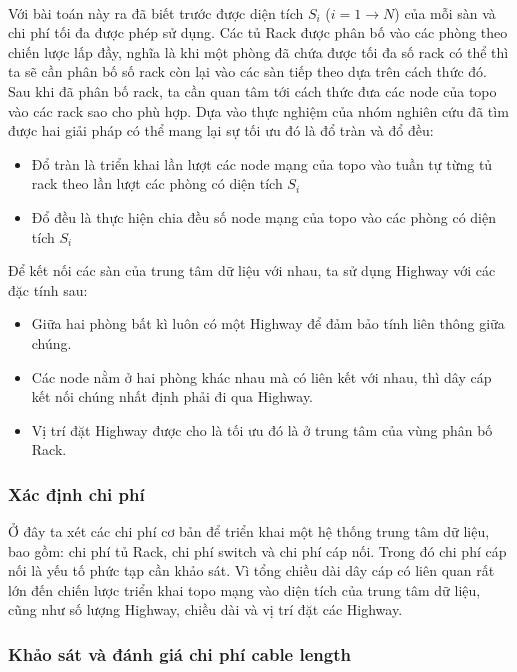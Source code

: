 \documentclass[../report.tex]{subfiles}
\begin{document}
\paragraph*{}
Với bài toán này ra đã biết trước được diện tích $S_i$ ($i = 1 \rightarrow N$) của mỗi sàn và chi phí tối đa được phép sử dụng.
Các tủ Rack được phân bố vào các phòng theo chiến lược lấp đầy, nghĩa là khi một phòng đã chứa được tối đa số rack có thể thì ta sẽ cần phân bố số rack còn lại vào các sàn tiếp theo dựa trên cách thức đó. Sau khi đã phân bố rack, ta cần quan tâm tới cách thức đưa các node của topo vào các rack sao cho phù hợp. Dựa vào thực nghiệm của nhóm nghiên cứu đã tìm được hai giải pháp có thể mang lại sự tối ưu đó là đổ tràn và đổ đều:
\begin{itemize}
        \item Đổ tràn là triển khai lần lượt các node mạng của topo vào tuần tự từng tủ rack theo lần lượt các phòng có diện tích $S_i$
        \item Đổ đều là thực hiện chia đều số node mạng của topo vào các phòng có diện tích $S_i$
\end{itemize}

Để kết nối các sàn của trung tâm dữ liệu với nhau, ta sử dụng Highway với các đặc tính sau:
\begin{itemize}
    \item Giữa hai phòng bất kì luôn có một Highway để đảm bảo tính liên thông giữa chúng.
    \item Các node nằm ở hai phòng khác nhau mà có liên kết với nhau, thì dây cáp kết nối chúng nhất định phải đi qua Highway.
    \item Vị trí đặt Highway được cho là tối ưu đó là ở trung tâm của vùng phân bố Rack.
\end{itemize}
\subsubsection{Xác định chi phí}
Ở đây ta xét các chi phí cơ bản để triển khai một hệ thống trung tâm dữ liệu, bao gồm: chi phí tủ Rack, chi phí switch và chi phí cáp nối. Trong đó chi phí cáp nối là yếu tố phức tạp cần khảo sát. Vì tổng chiều dài dây cáp có liên quan rất lớn đến chiến lược triển khai topo mạng vào diện tích của trung tâm dữ liệu, cũng như số lượng Highway, chiều dài và vị trí đặt các Highway. 

\subsubsection{Khảo sát và đánh giá chi phí cable length}
\end{document}
